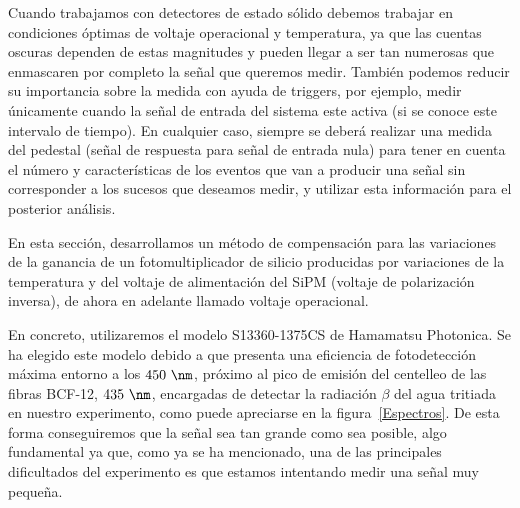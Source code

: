 Cuando trabajamos con detectores de estado sólido debemos trabajar en condiciones óptimas de voltaje operacional y temperatura, ya  que las cuentas oscuras dependen de estas magnitudes y pueden llegar a ser tan numerosas que enmascaren por completo la señal que queremos medir. También podemos reducir su importancia sobre la medida con ayuda de triggers, por ejemplo, medir únicamente cuando la señal de entrada del sistema este activa (si se conoce este intervalo de tiempo). En cualquier caso, siempre se deberá realizar una medida del pedestal (señal de respuesta para señal de entrada nula) para tener en cuenta el número y características de los eventos que van a producir una señal sin corresponder a los sucesos que deseamos medir, y utilizar esta información para el posterior análisis. 

En esta sección, desarrollamos un método de compensación para las variaciones de la ganancia de un fotomultiplicador de silicio producidas por variaciones  de la temperatura y del voltaje de alimentación del SiPM (voltaje de polarización inversa), de ahora en adelante llamado voltaje operacional. 

En concreto, utilizaremos el modelo S13360-1375CS de Hamamatsu Photonica. Se ha elegido este modelo debido a que presenta una eficiencia de fotodetección máxima entorno a los $450~\nm$, próximo al pico de emisión del centelleo de las fibras BCF-12, $435~\nm$, encargadas de detectar la radiación $\beta$ del agua tritiada en nuestro experimento, como puede apreciarse en la  figura~\ref{Espectros}. De esta forma conseguiremos que la señal sea tan grande como sea posible, algo fundamental ya que, como ya se ha mencionado, una de las principales dificultados del experimento es que estamos intentando medir una señal muy pequeña.

